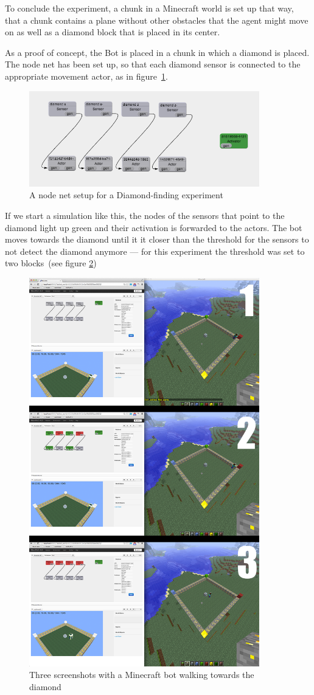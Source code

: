 To conclude the experiment, a chunk in a Minecraft world is set up that way, that a chunk contains a plane without other obstacles that the agent might move on as well as a diamond block that is placed in its center. 
    
As a proof of concept, the Bot is placed in a chunk in which a diamond is placed. The node net has been set up, so that each diamond sensor is connected to the appropriate movement actor, as in figure~\ref{nodenet_setup}.

\begin{figure}[h]
  \centering
    \includegraphics[width=10cm]{graphics/nodenet_setup}
  \caption{A node net setup for a Diamond-finding experiment}
  \label{nodenet_setup}
\end{figure}

If we start a simulation like this, the nodes of the sensors that point to the diamond light up green and their activation is forwarded to the actors. The bot moves towards the diamond until it it closer than the threshold for the sensors to not detect the diamond anymore --- for this experiment the threshold was set to two blocks~(see figure \ref{diamond_screens})

\begin{figure}[h]
  \centering
    \includegraphics[width=10cm]{graphics/diamond_screens}
  \caption{Three screenshots with a Minecraft bot walking towards the diamond}
  \label{diamond_screens}
\end{figure}